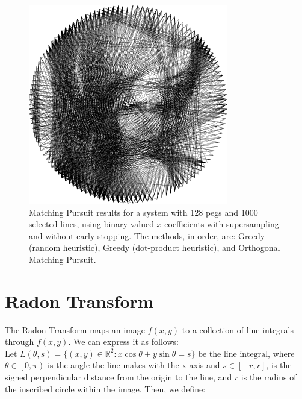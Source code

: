 \begin{figure}[H]
\begin{minipage}{0.2\linewidth}
    \end{minipage}
    \begin{minipage}{0.2\linewidth}
        \centering
        \includegraphics[width=\linewidth]{images/mp_binary/omp_binary.png}
    \end{minipage}
    \caption{Matching Pursuit results for a system with 128 pegs and 1000 selected lines, using binary valued \(x\) coefficients with supersampling and without early stopping. The methods, in order, are: Greedy (random heuristic), Greedy (dot-product heuristic), and Orthogonal Matching Pursuit.}
    \label{fig:mp_binary_outputs}
\end{figure}

\section{Radon Transform}

The Radon Transform maps an image \(f(x,y)\) to a collection of line integrals through \(f(x,y)\). We can express it as follows: \(\text{Let } L(\theta, s) = \{(x, y) \in \mathbb{R}^2 : x\cos\theta + y\sin\theta = s\} \text{ be the line integral}\), where \(\theta \in \left[0, \pi\right)\) is the angle the line makes with the x-axis and \(s \in \left[ -r, r\right]\), is the signed perpendicular distance from the origin to the line, and \(r\)  is the radius of the inscribed circle within the image. Then, we define:

